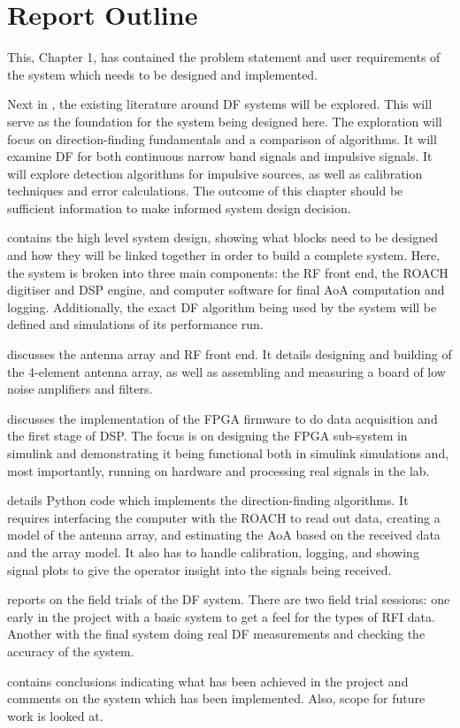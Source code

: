 \section{Report Outline}
This, Chapter 1, has contained the problem statement and user requirements of the system which needs to be designed and implemented. 

Next in , the existing literature around DF systems will be explored. This will serve as the foundation for the system being designed here. The exploration will focus on direction-finding fundamentals and a comparison of algorithms. It will examine DF for both continuous narrow band signals and impulsive signals. It will explore detection algorithms for impulsive sources, as well as calibration techniques and error calculations. The outcome of this chapter should be sufficient information to make informed system design decision.

 contains the high level system design, showing what blocks need to be designed and how they will be linked together in order to build a complete system. Here, the system is broken into three main components: the RF front end, the ROACH digitiser and DSP engine, and computer software for final AoA computation and logging. Additionally, the exact DF algorithm being used by the system will be defined and simulations of its performance run.

 discusses the antenna array and RF front end. It details designing and building of the 4-element antenna array, as well as assembling and measuring a board of low noise amplifiers and filters.

 discusses the implementation of the FPGA firmware to do data acquisition and the first stage of DSP. The focus is on designing the FPGA sub-system in simulink and demonstrating it being functional both in simulink simulations and, most importantly, running on hardware and processing real signals in the lab.

 details Python code which implements the direction-finding algorithms. It requires interfacing the computer with the ROACH to read out data, creating a model of the antenna array, and estimating the AoA based on the received data and the array model. It also has to handle calibration, logging, and showing signal plots to give the operator insight into the signals being received.

 reports on the field trials of the DF system. There are two field trial sessions: one early in the project with a basic system to get a feel for the types of RFI data. Another with the final system doing real DF measurements and checking the accuracy of the system.

 contains conclusions indicating what has been achieved in the project and comments on the system which has been implemented. Also, scope for future work is looked at.
